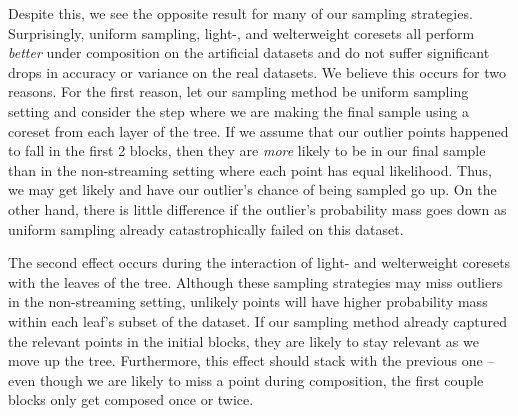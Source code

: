 Despite this, we see the opposite result for many of our sampling strategies. Surprisingly, uniform sampling, light-, and welterweight coresets all perform
\emph{better} under composition on the artificial datasets and do not suffer significant drops in accuracy or variance on the real datasets. We believe this
occurs for two reasons. For the first reason, let our sampling method be uniform sampling setting and consider the step where we are making the final sample
using a coreset from each layer of the tree. If we assume that our outlier points happened to fall in the first 2 blocks, then they are \emph{more} likely to be
in our final sample than in the non-streaming setting where each point has equal likelihood. Thus, we may get likely and have our outlier's chance of being
sampled go up. On the other hand, there is little difference if the outlier's probability mass goes down as uniform sampling already catastrophically failed
on this dataset.

The second effect occurs during the interaction of light- and welterweight coresets with the leaves of the tree. Although these sampling strategies may miss
outliers in the non-streaming setting, unlikely points will have higher probability mass within each leaf's subset of the dataset. If our sampling method
already captured the relevant points in the initial blocks, they are likely to stay relevant as we move up the tree. Furthermore, this effect should stack with
the previous one -- even though we are likely to miss a point during composition, the first couple blocks only get composed once or twice.





